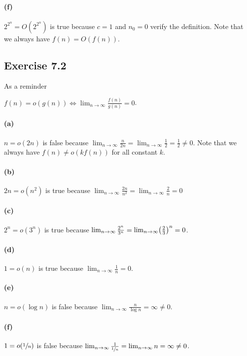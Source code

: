 \paragraph{(f)}
\(2^{2^n} = O(2^{2^n})\)
is true because \(c = 1\) and \(n_0 = 0\) verify the definition. Note that we
always have \(f(n) = O(f(n))\).

\subsection{Exercise 7.2}
As a reminder
\begin{definition}
	\(f(n) = o(g(n)) \iff \lim_{n \to \infty} \frac{f(n)}{g(n)} = 0\).
\end{definition}

\paragraph{(a)}
\(n = o(2n)\) is false because \(\lim_{n \to \infty} \frac{n}{2n} = \lim_{n \to
\infty} \frac{1}{2} = \frac{1}{2} \neq 0\). Note that we always have \(f(n)
\neq o(k f(n))\) for all constant \(k\).

\paragraph{(b)}
\(2n = o(n^2)\) is true because \(\lim_{n \to \infty} \frac{2n}{n^2} =
\lim_{n \to \infty} \frac{2}{n} = 0\)

\paragraph{(c)}
\(2^n = o(3^n)\) is true because \(\lim_{n \to \infty} \frac{2^n}{3^n} =
\lim_{n \to \infty} \mleft(\frac{2}{3}\mright)^n = 0\).

\paragraph{(d)}
\(1 = o(n)\) is true because \(\lim_{n \to \infty} \frac{1}{n} = 0\).

\paragraph{(e)}
\(n = o(\log n)\) is false because \(\lim_{n \to \infty} \frac{n}{\log n} =
\infty \neq 0\).

\paragraph{(f)}
\(1 = o(\sfrac{1}{n})\) is false because \(\lim_{n \to \infty}
\frac{1}{\sfrac{1}{n}} = \lim_{n \to \infty} n = \infty \neq 0\).
